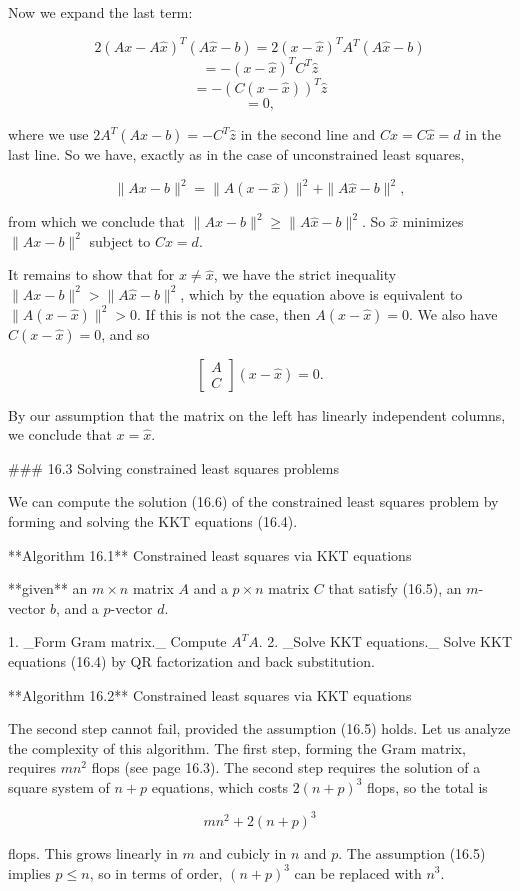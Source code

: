 Now we expand the last term:

\[2(Ax-A\hat{x})^{T}(A\hat{x}-b) = 2(x-\hat{x})^{T}A^{T}(A\hat{x}-b)\] \[= -(x-\hat{x})^{T}C^{T}\hat{z}\] \[= -(C(x-\hat{x}))^{T}\hat{z}\] \[= 0,\]

where we use \(2A^{T}(A\hat{x}-b)=-C^{T}\hat{z}\) in the second line and \(Cx=C\hat{x}=d\) in the last line. So we have, exactly as in the case of unconstrained least squares,

\[\|Ax-b\|^{2}=\|A(x-\hat{x})\|^{2}+\|A\hat{x}-b\|^{2},\]

from which we conclude that \(\|Ax-b\|^{2}\geq\|A\hat{x}-b\|^{2}\). So \(\hat{x}\) minimizes \(\|Ax-b\|^{2}\) subject to \(Cx=d\).

It remains to show that for \(x\neq\hat{x}\), we have the strict inequality \(\|Ax-b\|^{2}>\|A\hat{x}-b\|^{2}\), which by the equation above is equivalent to \(\|A(x-\hat{x})\|^{2}>0\). If this is not the case, then \(A(x-\hat{x})=0\). We also have \(C(x-\hat{x})=0\), and so

\[\left[\begin{array}{c}A\\ C\end{array}\right](x-\hat{x})=0.\]

By our assumption that the matrix on the left has linearly independent columns, we conclude that \(x=\hat{x}\).

### 16.3 Solving constrained least squares problems

We can compute the solution (16.6) of the constrained least squares problem by forming and solving the KKT equations (16.4).

**Algorithm 16.1** Constrained least squares via KKT equations

**given** an \(m\times n\) matrix \(A\) and a \(p\times n\) matrix \(C\) that satisfy (16.5), an \(m\)-vector \(b\), and a \(p\)-vector \(d\).

1. _Form Gram matrix._ Compute \(A^{T}A\).
2. _Solve KKT equations._ Solve KKT equations (16.4) by QR factorization and back substitution.

**Algorithm 16.2** Constrained least squares via KKT equations

The second step cannot fail, provided the assumption (16.5) holds. Let us analyze the complexity of this algorithm. The first step, forming the Gram matrix, requires \(mn^{2}\) flops (see page 16.3). The second step requires the solution of a square system of \(n+p\) equations, which costs \(2(n+p)^{3}\) flops, so the total is

\[mn^{2}+2(n+p)^{3}\]

flops. This grows linearly in \(m\) and cubicly in \(n\) and \(p\). The assumption (16.5) implies \(p\leq n\), so in terms of order, \((n+p)^{3}\) can be replaced with \(n^{3}\).

 